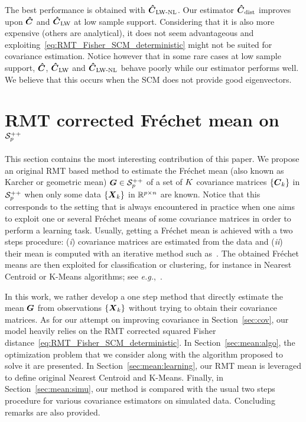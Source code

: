 \documentclass{article}
\theoremstyle{plain}
\theoremstyle{definition}
\theoremstyle{remark}
\begin{document}
The best performance is obtained with $\boldsymbol{\hat{C}}_{\textup{LW-NL}}$.
Our estimator $\boldsymbol{\hat{C}}_{\textup{dist}}$ improves upon $\boldsymbol{\hat{C}}$ and $\boldsymbol{\hat{C}}_{\textup{LW}}$ at low sample support.
Considering that it is also more expensive (others are analytical), it does not seem advantageous and exploiting~\eqref{eq:RMT_Fisher_SCM_deterministic} might not be suited for covariance estimation.
%
Notice however that in some rare cases at low sample support, $\boldsymbol{\hat{C}}$, $\boldsymbol{\hat{C}}_{\textup{LW}}$ and $\boldsymbol{\hat{C}}_{\textup{LW-NL}}$ behave poorly while our estimator performs well.
We believe that this occurs when the SCM does not provide good eigenvectors.




\section{RMT corrected Fréchet mean on $\mathcal{S}^{++}_{p}$}
\label{sec:mean}
This section contains the most interesting contribution of this paper.
We propose an original RMT based method to estimate the Fréchet mean (also known as Karcher or geometric mean) $\boldsymbol{G}\in\mathcal{S}^{++}_{p}$ of a set of $K$ covariance matrices $\{\boldsymbol{C}_k\}$ in $\mathcal{S}^{++}_{p}$ when only some data $\{\boldsymbol{X}_k\}$ in $\mathbb{R}^{p\times n}$ are known.
%
Notice that this corresponds to the setting that is always encountered in practice when one aims to exploit one or several Fréchet means of some covariance matrices in order to perform a learning task.
Usually, getting a Fréchet mean is achieved with a two steps procedure: (\emph{i}) covariance matrices are estimated from the data and (\emph{ii}) their mean is computed with an iterative method such as~\cite{fletcher2004principal,jeuris2012survey}.
The obtained Fréchet means are then exploited for classification or clustering, for instance in Nearest Centroid or K-Means algorithms; see \emph{e.g.},~\cite{tuzel2008pedestrian,barachant2011multiclass}.

In this work, we rather develop a one step method that directly estimate the mean $\boldsymbol{G}$ from observations $\{\boldsymbol{X}_k\}$ without trying to obtain their covariance matrices.
As for our attempt on improving covariance in Section~\ref{sec:cov}, our model heavily relies on the RMT corrected squared Fisher distance~\eqref{eq:RMT_Fisher_SCM_deterministic}.
In Section~\ref{sec:mean:algo}, the optimization problem that we consider along with the algorithm proposed to solve it are presented.
In Section~\ref{sec:mean:learning}, our RMT mean is leveraged to define original Nearest Centroid and K-Means.
Finally, in Section~\ref{sec:mean:simu}, our method is compared with the usual two steps procedure for various covariance estimators on simulated data.
Concluding remarks are also provided.
\end{document}
